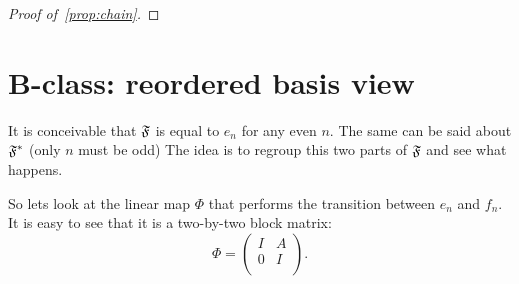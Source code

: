 \documentclass[12pt]{amsart}
\theoremstyle{case}
\begin{document}
  \begin{proof}[Proof of~\ref{prop:chain}]
  \end{proof}

\section{B-class: reordered basis view}
  It is conceivable that $\mathfrak{F}$ is equal to $e_n$ for any even $n$.
  The same can be said about $\mathfrak{F^{*}}$ (only $n$ must be odd)
  The idea is to regroup this two parts of $\mathfrak{F}$ and see what happens.
  

  So lets look at the linear map $\Phi$ that performs the transition between ${e_n}$ and ${f_n}$.
  It is easy to see that it is a two-by-two block matrix:
  \[
    \Phi= \left( {
      \begin{array}{cc}
        I & A\\
        0 & I\\
      \end{array}
    }
  \right).
  \]




\end{document}
